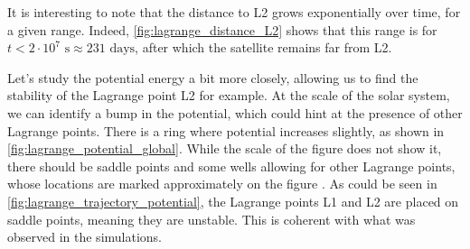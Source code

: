 It is interesting to note that the distance to L2 grows exponentially over time, for a given range. Indeed, \autoref{fig:lagrange_distance_L2} shows that this range is for \(t < 2 \cdot 10^7 \textrm{ s} \approx 231 \textrm{ days}\), after which the satellite remains far from L2.

Let's study the potential energy a bit more closely, allowing us to find the stability of the Lagrange point L2 for example. At the scale of the solar system, we can identify a bump in the potential, which could hint at the presence of other Lagrange points. There is a ring where potential increases slightly, as shown in \autoref{fig:lagrange_potential_global}. While the scale of the figure does not show it, there should be saddle points and some wells allowing for other Lagrange points, whose locations are marked approximately on the figure \cite{lagrange}. As could be seen in \autoref{fig:lagrange_trajectory_potential}, the Lagrange points L1 and L2 are placed on saddle points, meaning they are unstable. This is coherent with what was observed in the simulations.

